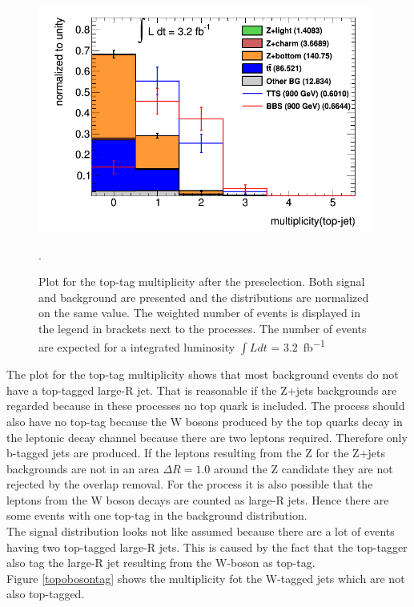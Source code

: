 \begin{figure}[h!]
\centering
\includegraphics[width=11cm]{figures/topmultiplicity.png}
\caption{Plot for the top-tag multiplicity after the preselection.
Both signal and background are presented and the distributions are normalized on the same value. 
The weighted number of events is displayed in the legend in brackets next to the processes. 
The number of events are expected for a integrated luminosity $\int L dt$ = \SI{3.2}{fb^{-1}}}.
\label{topmultipli}
\end{figure}


The plot for the top-tag multiplicity shows that most background events do not have a top-tagged large-R jet.
That is reasonable if the Z+jets backgrounds are regarded because in these processes no top quark is included. 
The \ttbar{} process should also have no top-tag because the W bosons produced by the top quarks decay in the leptonic decay channel because there are two leptons required.
Therefore only  b-tagged jets are produced.
If the leptons resulting from the Z for the Z+jets backgrounds are not in an area $\Delta R = 1.0$ around the Z candidate they are not rejected by the overlap removal.
For the \ttbar{} process it is also possible that the leptons from the W boson decays are counted as large-R jets.
Hence there are some events with one top-tag in the background distribution.\\
The signal distribution looks not like assumed because there are a lot of events having two top-tagged large-R jets.
This is caused by the fact that the top-tagger also tag the large-R jet resulting from the W-boson as top-tag.\\
Figure \ref{topobosontag} shows the multiplicity fot the W-tagged jets which are not also top-tagged.

